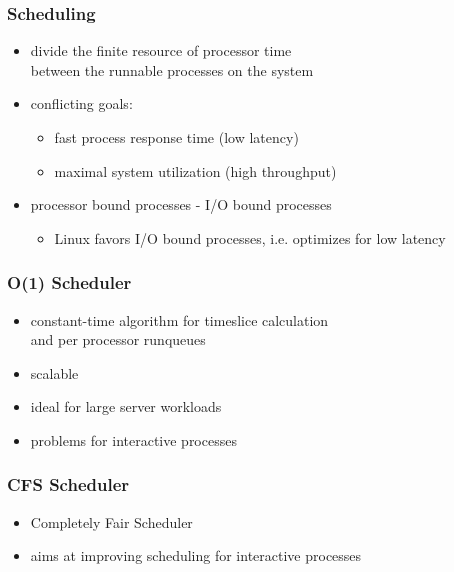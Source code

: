 \documentclass[dvipsnames]{beamer}
\begin{document}
\begin{frame}
  \frametitle{Scheduling}

  \begin{itemize}
    \item divide the finite resource of processor time\\
      between the runnable processes on the system

    \medskip
    \item conflicting goals:
    \begin{itemize}
      \item fast process response time (low latency)
      \item maximal system utilization (high throughput)
    \end{itemize}

    \medskip
    \item processor bound processes - I/O bound processes
    \begin{itemize}
      \item Linux favors I/O bound processes, i.e. optimizes for low latency
    \end{itemize}
  \end{itemize}
\end{frame}

\begin{frame}
  \frametitle{O(1) Scheduler}

  \begin{itemize}
    \item constant-time algorithm for timeslice calculation\\
      and per processor runqueues
    \item scalable
    \item ideal for large server workloads
    \item problems for interactive processes
  \end{itemize}
\end{frame}

\begin{frame}
  \frametitle{CFS Scheduler}

  \begin{itemize}
    \item Completely Fair Scheduler
    \item aims at improving scheduling for interactive processes
  \end{itemize}
\end{frame}
\end{document}
